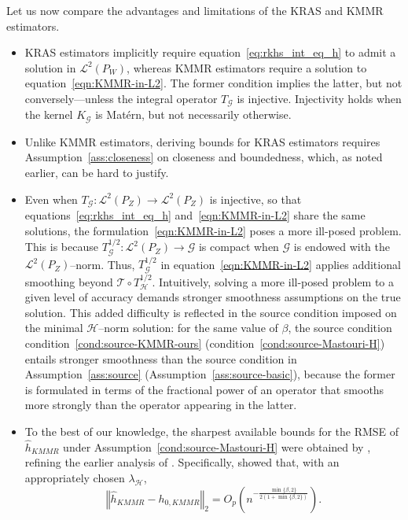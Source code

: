 \documentclass[twoside,11pt]{article}
\newcommand{\mc}{\mathcal}
\begin{document}
Let us now compare the advantages and limitations of the KRAS and KMMR estimators.
\begin{itemize}
\item KRAS estimators implicitly require equation~\eqref{eq:rkhs_int_eq_h} to admit a solution in $\mathcal{L}^2(P_W)$, whereas KMMR estimators require a solution to equation~\eqref{eqn:KMMR-in-L2}. The former condition implies the latter, but not conversely---unless the integral operator $T_\mc{G}$ is injective. Injectivity holds when the kernel $K_\mc{G}$ is Mat\'ern, but not necessarily otherwise. 
\item Unlike KMMR estimators, deriving bounds for KRAS estimators requires Assumption~\ref{ass:closeness} on closeness and boundedness, which, as noted earlier, can be hard to justify.

\item Even when $T_\mc{G}: \mc{L}^2(P_Z) \rightarrow \mc{L}^2(P_Z)$ is injective, so that equations~\eqref{eq:rkhs_int_eq_h} and~\eqref{eqn:KMMR-in-L2} share the same solutions, the formulation~\eqref{eqn:KMMR-in-L2} poses a more ill-posed problem. This is because $T_\mc{G}^{1/2}:\mc{L}^2(P_Z)\rightarrow\mc{G}$ is compact when $\mc{G}$ is endowed with the $\mc{L}^2(P_Z)$--norm. Thus, $T_\mc{G}^{1/2}$ in equation~\eqref{eqn:KMMR-in-L2} applies additional smoothing beyond $\mc{T} \circ T_\mc{H}^{1/2}$. Intuitively, solving a more ill-posed problem to a given level of accuracy demands stronger smoothness assumptions on the true solution. This added difficulty is reflected in the source condition imposed on the minimal $\mc{H}$--norm solution: for the same value of $\beta$, the source condition condition~\eqref{cond:source-KMMR-ours} (condition~\eqref{cond:source-Mastouri-H}) entails stronger smoothness than the source condition in Assumption~\ref{ass:source} (Assumption~\ref{ass:source-basic}), because the former is formulated in terms of the fractional power of an operator that smooths more strongly than the operator appearing in the latter.
\item To the best of our knowledge, the sharpest available bounds for the RMSE of $\hat{h}_{KMMR}$ under Assumption~\eqref{cond:source-Mastouri-H} were obtained by \cite{park2024proximal}, refining the earlier analysis of \cite{mastouri2021proximal}. Specifically, \cite{park2024proximal} showed that, with an appropriately chosen $\lambda_{\mc{H}}$, 
\[
\left\Vert \hat h_{KMMR}-h_{0,KMMR}\right\Vert_2=O_p\left(n^{-\frac{\min\{\beta, 2\}}{2(1+\min\{\beta, 2\})}}\right).
\]

\end{itemize}
\end{document}
